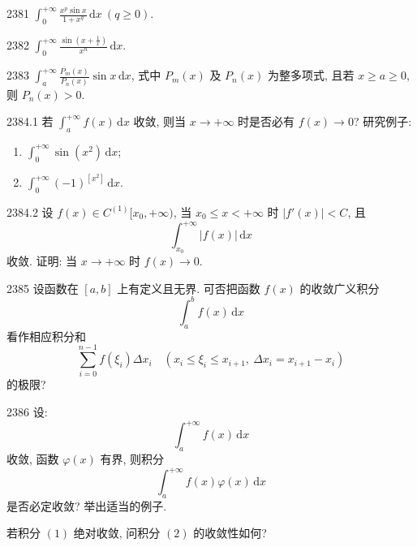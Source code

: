 \begin{prob}[S]{2381}
$\displaystyle\int_0^{+\infty} \frac{x^p \sin x}{1 + x^q}\,\mathrm{d}x\ (q \geqslant 0)$.
\end{prob}

\begin{prob}[S]{2382}
$\displaystyle\int_0^{+\infty} \frac{\sin\left(x + \frac{1}{x}\right)}{x^n}\,\mathrm{d}x$.
\end{prob}

\begin{prob}[M]{2383}
$\displaystyle\int_a^{+\infty} \frac{P_m(x)}{P_n(x)} \sin x\,\mathrm{d}x$, 式中 $P_m(x)$ 及 $P_n(x)$ 为整多项式, 且若 $x \geqslant a \geqslant 0$, 则 $P_n(x) > 0$.
\end{prob}

\begin{prob}[M]{2384.1}
若 $\displaystyle\int_a^{+\infty} f(x)\,\mathrm{d}x$ 收敛, 则当 $x \to +\infty$ 时是否必有 $f(x) \to 0$? 研究例子:
\begin{enumerate}[label=(\alph*), itemsep=2pt, topsep=3pt]
\item $\displaystyle\int_0^{+\infty} \sin(x^2)\,\mathrm{d}x$;
\item $\displaystyle\int_0^{+\infty} (-1)^{[x^2]}\,\mathrm{d}x$.
\end{enumerate}
\end{prob}

\begin{prob}[M]{2384.2}
设 $f(x) \in C^{(1)}[x_0, +\infty)$, 当 $x_0 \leqslant x < +\infty$ 时 $|f'(x)| < C$, 且
\[
\int_{x_0}^{+\infty} |f(x)|\,\mathrm{d}x
\]
收敛. 证明: 当 $x \to +\infty$ 时 $f(x) \to 0$. 
\end{prob}

\begin{prob}[M]{2385}
设函数在 $[a, b]$ 上有定义且无界. 可否把函数 $f(x)$ 的收敛广义积分
\[
\int_a^b f(x)\,\mathrm{d}x
\]
看作相应积分和
\[
\sum_{i=0}^{n-1} f(\xi_i) \Delta x_i \quad (x_i \leqslant \xi_i \leqslant x_{i+1},\ \Delta x_i = x_{i+1} - x_i)
\]
的极限?
\end{prob}

\begin{prob}[M]{2386}
设:
\[
\int_a^{+\infty} f(x)\,\mathrm{d}x \tag{1}
\]
收敛, 函数 $\varphi(x)$ 有界, 则积分
\[
\int_a^{+\infty} f(x)\varphi(x)\,\mathrm{d}x \tag{2}
\]
是否必定收敛? 举出适当的例子.

若积分 $(1)$ 绝对收敛, 问积分 $(2)$ 的收敛性如何?
\end{prob}

